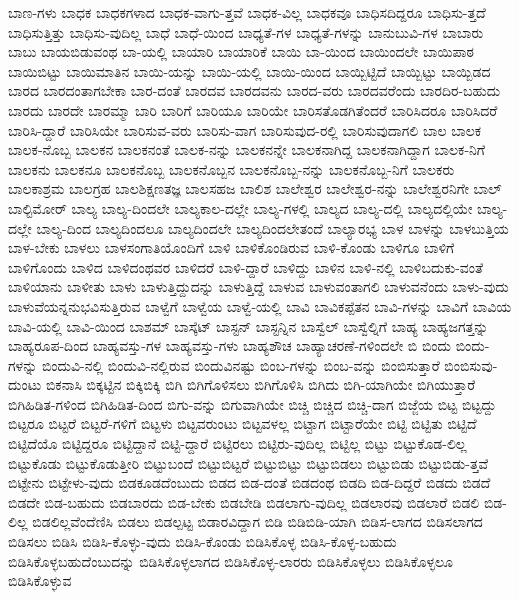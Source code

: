 {ಬಾಣ-ಗಳು
ಬಾಧಕ
ಬಾಧಕಗಳಾದ
ಬಾಧಕ-ವಾಗು-ತ್ತವೆ
ಬಾಧಕ-ವಿಲ್ಲ
ಬಾಧಕವೂ
ಬಾಧಿಸದಿದ್ದರೂ
ಬಾಧಿಸು-ತ್ತದೆ
ಬಾಧಿಸುತ್ತಿತ್ತು
ಬಾಧಿಸು-ವುದಿಲ್ಲ
ಬಾಧೆ
ಬಾಧೆ-ಯಿಂದ
ಬಾಧ್ಯತೆ-ಗಳ
ಬಾಧ್ಯತೆ-ಗಳನ್ನು
ಬಾನುಬುವಿ-ಗಳ
ಬಾಬಾರು
ಬಾಬು
ಬಾಯಬಿಡುವಂಥ
ಬಾ-ಯಲ್ಲಿ
ಬಾಯಾರಿ
ಬಾಯಾರಿಕೆ
ಬಾಯಿ
ಬಾ-ಯಿಂದ
ಬಾಯಿಂದಲೇ
ಬಾಯಿಪಾಠ
ಬಾಯಿಬಿಟ್ಟು
ಬಾಯಿಮಾತಿನ
ಬಾಯಿ-ಯನ್ನು
ಬಾಯಿ-ಯಲ್ಲಿ
ಬಾಯಿ-ಯಿಂದ
ಬಾಯ್ಬಿಟ್ಟಿದೆ
ಬಾಯ್ಬಿಟ್ಟು
ಬಾಯ್ಬಿಡದ
ಬಾರದ
ಬಾರದಂತಾಗಬೇಕಾ
ಬಾರ-ದಂತೆ
ಬಾರದವ
ಬಾರದವನು
ಬಾರದ-ವರು
ಬಾರದವರೆಂದು
ಬಾರದಿರ-ಬಹುದು
ಬಾರದು
ಬಾರದೇ
ಬಾರಮ್ಮಾ
ಬಾರಿ
ಬಾರಿಗೆ
ಬಾರಿಯೂ
ಬಾರಿಯೇ
ಬಾರಿಸತೊಡಗಿತೆಂದರೆ
ಬಾರಿಸಿದರೂ
ಬಾರಿಸಿದರೆ
ಬಾರಿಸಿ-ದ್ದಾರೆ
ಬಾರಿಸಿಯೇ
ಬಾರಿಸುವ-ವರು
ಬಾರಿಸು-ವಾಗ
ಬಾರಿಸುವುದ-ರಲ್ಲಿ
ಬಾರಿಸುವುದಾಗಲಿ
ಬಾಲ
ಬಾಲಕ
ಬಾಲಕ-ನೊಬ್ಬ
ಬಾಲಕನ
ಬಾಲಕನಂತೆ
ಬಾಲಕ-ನನ್ನು
ಬಾಲಕನನ್ನೇ
ಬಾಲಕನಾಗಿದ್ದ
ಬಾಲಕನಾಗಿದ್ದಾಗ
ಬಾಲಕ-ನಿಗೆ
ಬಾಲಕನು
ಬಾಲಕನೂ
ಬಾಲಕನೊಬ್ಬ
ಬಾಲಕನೊಬ್ಬನ
ಬಾಲಕನೊಬ್ಬ-ನನ್ನು
ಬಾಲಕನೊಬ್ಬ-ನಿಗೆ
ಬಾಲಕರು
ಬಾಲಕಾಶ್ರಮ
ಬಾಲಗ್ರಹ
ಬಾಲಶಿಕ್ಷಣತಜ್ಞ
ಬಾಲಸಹಜ
ಬಾಲಿಶ
ಬಾಲೇಶ್ವರ
ಬಾಲೇಶ್ವರ-ನನ್ನು
ಬಾಲೇಶ್ವರನಿಗೇ
ಬಾಲ್
ಬಾಲ್ಟಿಮೋರ್
ಬಾಲ್ಯ
ಬಾಲ್ಯ-ದಿಂದಲೇ
ಬಾಲ್ಯಕಾಲ-ದಲ್ಲೇ
ಬಾಲ್ಯ-ಗಳಲ್ಲಿ
ಬಾಲ್ಯದ
ಬಾಲ್ಯ-ದಲ್ಲಿ
ಬಾಲ್ಯದಲ್ಲಿಯೇ
ಬಾಲ್ಯ-ದಲ್ಲೇ
ಬಾಲ್ಯ-ದಿಂದ
ಬಾಲ್ಯದಿಂದಲೂ
ಬಾಲ್ಯದಿಂದಲೇ
ಬಾಲ್ಯದಿಂದಲೇತಂದೆ
ಬಾಲ್ಯಾರಭ್ಯ
ಬಾಳ
ಬಾಳನ್ನು
ಬಾಳಬುತ್ತಿಯ
ಬಾಳ-ಬೇಕು
ಬಾಳಲು
ಬಾಳಸಂಗಾತಿಯೊಂದಿಗೆ
ಬಾಳಿ
ಬಾಳಿಕೊಂಡಿರುವ
ಬಾಳಿ-ಕೊಂಡು
ಬಾಳಿಗೂ
ಬಾಳಿಗೆ
ಬಾಳಿಗೊಂದು
ಬಾಳಿದ
ಬಾಳಿದಂಥವರ
ಬಾಳಿದರೆ
ಬಾಳಿ-ದ್ದಾರೆ
ಬಾಳಿದ್ದು
ಬಾಳಿನ
ಬಾಳಿ-ನಲ್ಲಿ
ಬಾಳಿಬದುಕು-ವಂತೆ
ಬಾಳಿಯಾನು
ಬಾಳೀತು
ಬಾಳು
ಬಾಳುತ್ತಿದ್ದುದನ್ನು
ಬಾಳುತ್ತಿದ್ದೆ
ಬಾಳುವ
ಬಾಳುವಂತಾಗಲಿ
ಬಾಳುವನೆಂದು
ಬಾಳು-ವುದು
ಬಾಳುವೆಯನ್ನನುಭವಿಸುತ್ತಿರುವ
ಬಾಳ್ವೆಗೆ
ಬಾಳ್ವೆಯ
ಬಾಳ್ವೆ-ಯಲ್ಲಿ
ಬಾವಿ
ಬಾವಿಕಪ್ಪೆತನ
ಬಾವಿ-ಗಳನ್ನು
ಬಾವಿಗೆ
ಬಾವಿಯ
ಬಾವಿ-ಯಲ್ಲಿ
ಬಾವಿ-ಯಿಂದ
ಬಾಶಮ್
ಬಾಸ್ಕೆಟ್
ಬಾಸ್ಟನ್
ಬಾಸ್ಟನ್ನಿನ
ಬಾಸ್ವೆಲ್
ಬಾಸ್ವೆಲ್ನಿಗೆ
ಬಾಹ್ಯ
ಬಾಹ್ಯಜಗತ್ತನ್ನು
ಬಾಹ್ಯರೂಪ-ದಿಂದ
ಬಾಹ್ಯವಸ್ತು-ಗಳ
ಬಾಹ್ಯವಸ್ತು-ಗಳು
ಬಾಹ್ಯಶೌಚ
ಬಾಹ್ಯಾಚರಣೆ-ಗಳಿಂದಲೇ
ಬಿ
ಬಿಂದು
ಬಿಂದು-ಗಳನ್ನು
ಬಿಂದುವಿ-ನಲ್ಲಿ
ಬಿಂದುವಿ-ನಲ್ಲಿರುವ
ಬಿಂದುವಿನಷ್ಟು
ಬಿಂಬ-ಗಳನ್ನು
ಬಿಂಬ-ವನ್ನು
ಬಿಂಬಿಸುತ್ತಾರೆ
ಬಿಂಬಿಸುವು-ದುಂಟು
ಬಿಕನಾಸಿ
ಬಿಕ್ಕಟ್ಟಿನ
ಬಿಕ್ಕಿಬಿಕ್ಕಿ
ಬಿಗಿ
ಬಿಗಿಗೊಳಿಸಲು
ಬಿಗಿಗೊಳಿಸಿ
ಬಿಗಿದು
ಬಿಗಿ-ಯಾಗಿಯೇ
ಬಿಗಿಯುತ್ತಾರೆ
ಬಿಗಿಹಿಡಿತ-ಗಳಿಂದ
ಬಿಗಿಹಿಡಿತ-ದಿಂದ
ಬಿಗು-ವನ್ನು
ಬಿಗುವಾಗಿಯೇ
ಬಿಚ್ಚಿ
ಬಿಚ್ಚಿದ
ಬಿಚ್ಚಿ-ದಾಗ
ಬಿಜ್ಜೆಯ
ಬಿಟ್ಟ
ಬಿಟ್ಟದ್ದು
ಬಿಟ್ಟರೂ
ಬಿಟ್ಟರೆ
ಬಿಟ್ಟರೆ-ಗಳಿಗೆ
ಬಿಟ್ಟಳು
ಬಿಟ್ಟವರುಂಟು
ಬಿಟ್ಟವಳಲ್ಲ
ಬಿಟ್ಟಾಗ
ಬಿಟ್ಟಾರೆಯೇ
ಬಿಟ್ಟಿ
ಬಿಟ್ಟಿತು
ಬಿಟ್ಟಿದೆ
ಬಿಟ್ಟಿದೆಯೊ
ಬಿಟ್ಟಿದ್ದರೂ
ಬಿಟ್ಟಿದ್ದಾನೆ
ಬಿಟ್ಟಿ-ದ್ದಾರೆ
ಬಿಟ್ಟಿರಲು
ಬಿಟ್ಟಿರು-ವುದಿಲ್ಲ
ಬಿಟ್ಟಿಲ್ಲ
ಬಿಟ್ಟು
ಬಿಟ್ಟುಕೊಡ-ಲಿಲ್ಲ
ಬಿಟ್ಟುಕೊಡು
ಬಿಟ್ಟುಕೊಡುತ್ತೀರಿ
ಬಿಟ್ಟುಬಂದೆ
ಬಿಟ್ಟುಬಿಟ್ಟರೆ
ಬಿಟ್ಟುಬಿಟ್ಟು
ಬಿಟ್ಟುಬಿಡಲು
ಬಿಟ್ಟುಬಿಡು
ಬಿಟ್ಟುಬಿಡು-ತ್ತವೆ
ಬಿಟ್ಟೇನು
ಬಿಟ್ಟೇಳು-ವುದು
ಬಿಡಕೂಡದೆಂಬುದು
ಬಿಡದ
ಬಿಡ-ದಂತೆ
ಬಿಡದಂಥ
ಬಿಡದಿ
ಬಿಡ-ದಿದ್ದರೆ
ಬಿಡದು
ಬಿಡದೆ
ಬಿಡದೇ
ಬಿಡ-ಬಹುದು
ಬಿಡಬಾರದು
ಬಿಡ-ಬೇಕು
ಬಿಡಬೇಡಿ
ಬಿಡಲಾಗು-ವುದಿಲ್ಲ
ಬಿಡಲಾರವು
ಬಿಡಲಾರೆ
ಬಿಡಲಿ
ಬಿಡ-ಲಿಲ್ಲ
ಬಿಡಲಿಲ್ಲವೆಂದೆಣಿಸಿ
ಬಿಡಲು
ಬಿಡಲ್ಪಟ್ಟ
ಬಿಡಾರವಿದ್ದಾಗ
ಬಿಡಿ
ಬಿಡಿಬಿಡಿ-ಯಾಗಿ
ಬಿಡಿಸ-ಲಾಗದ
ಬಿಡಿಸಲಾಗದ
ಬಿಡಿಸಲು
ಬಿಡಿಸಿ
ಬಿಡಿಸಿ-ಕೊಳ್ಳು-ವುದು
ಬಿಡಿಸಿ-ಕೊಂಡು
ಬಿಡಿಸಿಕೊಳ್ಳ
ಬಿಡಿಸಿ-ಕೊಳ್ಳ-ಬಹುದು
ಬಿಡಿಸಿಕೊಳ್ಳಬಹುದೆಂಬುದನ್ನು
ಬಿಡಿಸಿಕೊಳ್ಳಲಾಗದ
ಬಿಡಿಸಿಕೊಳ್ಳ-ಲಾರರು
ಬಿಡಿಸಿಕೊಳ್ಳಲು
ಬಿಡಿಸಿಕೊಳ್ಳಲೂ
ಬಿಡಿಸಿಕೊಳ್ಳುವ
}
